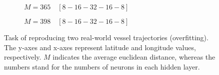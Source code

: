 \begin{figure}[H]\ContinuedFloat
     \begin{subfigure}[b]{0.48\textwidth}
         \centering
             
         \caption{$M=365 \quad [8-16-32-16-8]$}
         \label{fig:double5}
     \end{subfigure}
               \hfill
     \begin{subfigure}[b]{0.48\textwidth}
         \centering
             
         \caption{$M=398 \quad [8-16-32-16-8]$}
         \label{fig:double6}
     \end{subfigure}
     \caption{Task of reproducing two real-world vessel trajectories (overfitting). The y-axes and x-axes represent latitude and longitude values, respectively. $M$ indicates the average euclidean distance, whereas the numbers stand for the numbers of neurons in each hidden layer.}
     \label{fig:double}
\end{figure}

